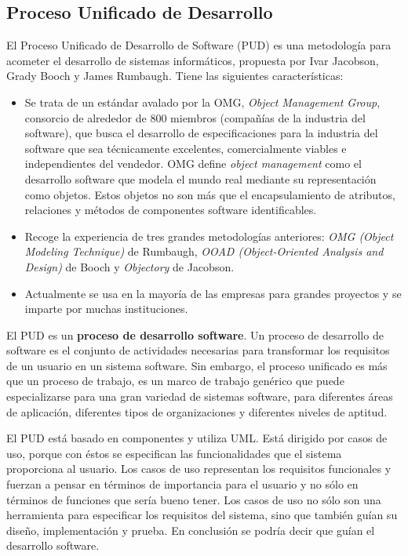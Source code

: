   \subsection{Proceso Unificado de Desarrollo} %
    \label{sub:proceso_unificado_de_desarrollo}
    
    El Proceso Unificado de Desarrollo de Software (PUD) es una metodología para acometer el desarrollo de sistemas informáticos, propuesta por Ivar Jacobson, Grady Booch y James Rumbaugh. Tiene las siguientes características:
    
    \begin{itemize}
      \item Se trata de un estándar avalado por la OMG, {\it Object Management Group}, consorcio de alrededor de 800 miembros (compañías de la industria del software), que busca el desarrollo de especificaciones para la industria del software que sea técnicamente excelentes, comercialmente viables e independientes del vendedor. OMG define {\it object management} como el desarrollo software que modela el mundo real mediante su representación como objetos. Estos objetos no son más que el encapsulamiento de atributos, relaciones y métodos de componentes software identificables.
      \item Recoge la experiencia de tres grandes metodologías anteriores: {\it OMG (Object Modeling Technique)} de Rumbaugh, {\it OOAD (Object-Oriented Analysis and Design)} de Booch y {\it Objectory} de Jacobson.
       \item Actualmente se usa en la mayoría de las empresas para grandes proyectos y se imparte por muchas instituciones.
    \end{itemize}
  
    El PUD es un {\bf proceso de desarrollo software}. Un proceso de desarrollo de software es el conjunto de actividades necesarias para transformar los requisitos de un usuario en un sistema software. Sin embargo, el proceso unificado es más que un proceso de trabajo, es un marco de trabajo genérico que puede especializarse para una gran variedad de sistemas software, para diferentes áreas de aplicación, diferentes tipos de organizaciones y diferentes niveles de aptitud.
  
    El PUD está basado en componentes y utiliza UML. Está dirigido por casos de uso, porque con éstos se especifican las funcionalidades que el sistema proporciona al usuario. Los casos de uso representan los requisitos funcionales y fuerzan a pensar en términos de importancia para el usuario y no sólo en términos de funciones que sería bueno tener. Los casos de uso no sólo son una herramienta para especificar los requisitos del sistema, sino que también guían su diseño, implementación y prueba. En conclusión se podría decir que guían el desarrollo software.
  
